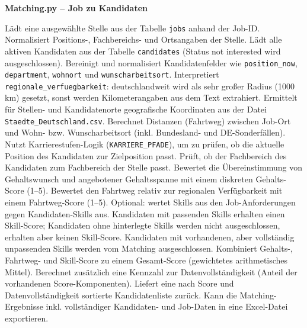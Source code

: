 
\textbf{Matching.py -- Job zu Kandidaten}

Lädt eine ausgewählte Stelle aus der Tabelle \texttt{jobs} anhand der Job-ID.
Normalisiert Positions-, Fachbereichs- und Ortsangaben der Stelle.
Lädt alle aktiven Kandidaten aus der Tabelle \texttt{candidates} (Status \glqq not interested\grqq{} wird ausgeschlossen).
Bereinigt und normalisiert Kandidatenfelder wie \texttt{position\_now}, \texttt{department}, \texttt{wohnort} und \texttt{wunscharbeitsort}.
Interpretiert \texttt{regionale\_verfuegbarkeit}: \glqq deutschlandweit\grqq{} wird als sehr großer Radius (1000 km) gesetzt, sonst werden Kilometerangaben aus dem Text extrahiert.
Ermittelt für Stellen- und Kandidatenorte geografische Koordinaten aus der Datei \texttt{Staedte\_Deutschland.csv}.
Berechnet Distanzen (Fahrtweg) zwischen Job-Ort und Wohn- bzw. Wunscharbeitsort (inkl. Bundesland- und DE-Sonderfällen).
Nutzt Karrierestufen-Logik (\texttt{KARRIERE\_PFADE}), um zu prüfen, ob die aktuelle Position des Kandidaten zur Zielposition passt.
Prüft, ob der Fachbereich des Kandidaten zum Fachbereich der Stelle passt.
Bewertet die Übereinstimmung von Gehaltswunsch und angebotener Gehaltsspanne mit einem diskreten Gehalts-Score (1--5).
Bewertet den Fahrtweg relativ zur regionalen Verfügbarkeit mit einem Fahrtweg-Score (1--5).
Optional: wertet Skills aus den Job-Anforderungen gegen Kandidaten-Skills aus.
Kandidaten mit passenden Skills erhalten einen Skill-Score; Kandidaten ohne hinterlegte Skills werden nicht ausgeschlossen, erhalten aber keinen Skill-Score.
Kandidaten mit vorhandenen, aber vollständig unpassenden Skills werden vom Matching ausgeschlossen.
Kombiniert Gehalts-, Fahrtweg- und Skill-Score zu einem Gesamt-Score (gewichtetes arithmetisches Mittel).
Berechnet zusätzlich eine Kennzahl zur Datenvollständigkeit (Anteil der vorhandenen Score-Komponenten).
Liefert eine nach Score und Datenvollständigkeit sortierte Kandidatenliste zurück.
Kann die Matching-Ergebnisse inkl. vollständiger Kandidaten- und Job-Daten in eine Excel-Datei exportieren.

